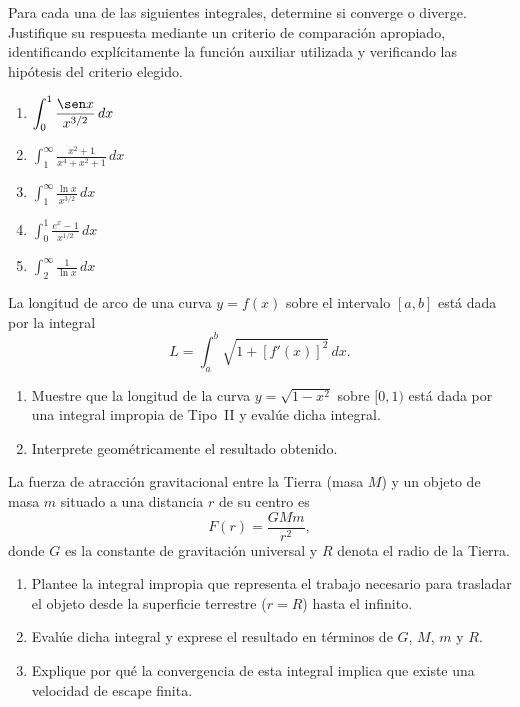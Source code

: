\begin{prob}
Para cada una de las siguientes integrales, determine si converge o
diverge. Justifique su respuesta mediante un criterio de comparación
apropiado, identificando explícitamente la función auxiliar utilizada y
verificando las hipótesis del criterio elegido.
\begin{enumerate}
    \item $\displaystyle \int_{0}^{1} \frac{\sen x}{x^{3/2}} \, dx$
    \item $\displaystyle \int_{1}^{\infty} \frac{x^2 + 1}{x^4 + x^2 + 1} \, dx$
    \item $\displaystyle \int_{1}^{\infty} \frac{\ln x}{x^{3/2}} \, dx$
    \item $\displaystyle \int_{0}^{1} \frac{e^x - 1}{x^{1/2}} \, dx$
    \item $\displaystyle \int_{2}^{\infty} \frac{1}{\ln x} \, dx$
\end{enumerate}
\end{prob}

\begin{prob}
La longitud de arco de una curva $y = f(x)$ sobre el intervalo $[a, b]$
está dada por la integral
\[
    L = \int_{a}^{b} \sqrt{1 + \left[f'(x)\right]^2} \, dx.
\]
\begin{enumerate}
    \item Muestre que la longitud de la curva $y = \sqrt{1 - x^2}$ sobre
          $[0,1)$ está dada por una integral impropia de Tipo~II y evalúe
          dicha integral.
    \item Interprete geométricamente el resultado obtenido.
\end{enumerate}
\end{prob}

\begin{prob}
La fuerza de atracción gravitacional entre la Tierra (masa $M$) y un objeto
de masa $m$ situado a una distancia $r$ de su centro es
\[
    F(r) = \frac{GMm}{r^2},
\]
donde $G$ es la constante de gravitación universal y $R$ denota el radio
de la Tierra.
\begin{enumerate}
    \item Plantee la integral impropia que representa el trabajo necesario
          para trasladar el objeto desde la superficie terrestre ($r = R$)
          hasta el infinito.
    \item Evalúe dicha integral y exprese el resultado en términos de $G$,
          $M$, $m$ y $R$.
    \item Explique por qué la convergencia de esta integral implica que
          existe una velocidad de escape finita.
\end{enumerate}
\end{prob}

